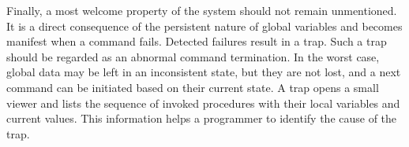 Finally, a most welcome property of the system should not remain
unmentioned. It is a direct consequence of the persistent nature of
global variables and becomes manifest when a command fails. Detected
failures result in a trap. Such a trap should be regarded as an
abnormal command termination. In the worst case, global data may be
left in an inconsistent state, but they are not lost, and a next
command can be initiated based on their current state. A trap opens a
small viewer and lists the sequence of invoked procedures with their
local variables and current values. This information helps a
programmer to identify the cause of the trap.

\bye
